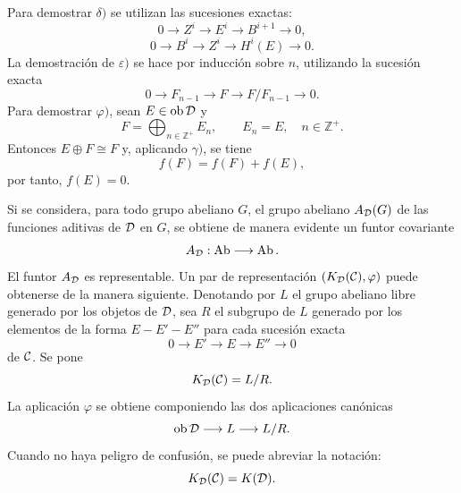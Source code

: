 Para demostrar $\delta)$ se utilizan las sucesiones exactas:
\[
0\longrightarrow Z^i\longrightarrow E^i\longrightarrow B^{i+1}\longrightarrow 0,
\]
\[
0\longrightarrow B^i\longrightarrow Z^i\longrightarrow H^i(E)\longrightarrow 0.
\]
La demostración de $\varepsilon)$ se hace por inducción sobre $n$, utilizando la sucesión exacta
\[
0\longrightarrow F_{n-1}\longrightarrow F\longrightarrow F/F_{n-1}\longrightarrow 0.
\]
Para demostrar $\varphi)$, sean $E\in\operatorname{ob}\mathcal D$ y
\[
F=\bigoplus_{n\in\mathbb Z^+}E_n,\qquad E_n=E,\quad n\in\mathbb Z^+.
\]
Entonces $E\oplus F\cong F$ y, aplicando $\gamma)$, se tiene
\[
f(F)=f(F)+f(E),
\]
por tanto, $f(E)=0$.

Si se considera, para todo grupo abeliano $G$, el grupo abeliano $A_{\mathcal D}(G)$ de las funciones aditivas de $\mathcal D$ en $G$, se obtiene de manera evidente un funtor covariante
\[
A_{\mathcal D}:\operatorname{Ab}\longrightarrow\operatorname{Ab}.
\]
El funtor $A_{\mathcal D}$ es representable. Un par de representación $(K_{\mathcal D}(\mathcal C),\varphi)$ puede obtenerse de la manera siguiente. Denotando por $L$ el grupo abeliano libre generado por los objetos de $\mathcal D$, sea $R$ el subgrupo de $L$ generado por los elementos de la forma $E-E'-E''$ para cada sucesión exacta
\[
0\longrightarrow E'\longrightarrow E\longrightarrow E''\longrightarrow 0
\]
de $\mathcal C$. Se pone
\[
K_{\mathcal D}(\mathcal C)=L/R.
\]
La aplicación $\varphi$ se obtiene componiendo las dos aplicaciones canónicas
\[
\operatorname{ob}\mathcal D\longrightarrow L\longrightarrow L/R.
\]
Cuando no haya peligro de confusión, se puede abreviar la notación:
\[
K_{\mathcal D}(\mathcal C)=K(\mathcal D).
\]
